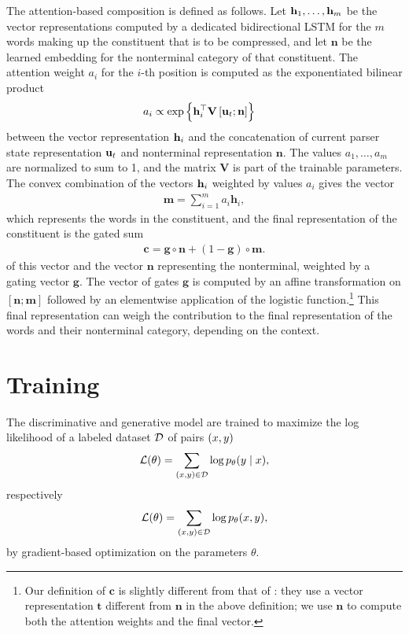     The attention-based composition is defined as follows. Let $\mathbf{h}_1, \dots, \mathbf{h}_m$ be the vector representations computed by a dedicated bidirectional LSTM for the $m$ words making up the constituent that is to be compressed, and let $\mathbf{n}$ be the learned embedding for the nonterminal category of that constituent. The attention weight $a_i$ for the $i$-th position is computed as the exponentiated bilinear product
    \begin{align*}
      a_i &\propto \exp \Big\{ \mathbf{h}_i^{\top} \mathbf{V} \, [\mathbf{u}_t ; \mathbf{n}] \Big\}
    \end{align*}
    between the vector representation $\mathbf{h}_i$ and the concatenation of current parser state representation $\mathbf{u}_t$ and nonterminal representation $\mathbf{n}$. The values $a_1, \dots, a_m$ are normalized to sum to 1, and the matrix $\mathbf{V}$ is part of the trainable parameters. The convex combination of the vectors $\mathbf{h}_i$ weighted by values $a_i$ gives the vector
    \begin{align*}
      \mathbf{m} = \sum_{i=1}^m a_i \mathbf{h}_i,
    \end{align*}
    which represents the words in the constituent, and the final representation of the constituent is the gated sum
    \begin{align*}
      \mathbf{c} = \mathbf{g} \circ \mathbf{n} + (1 - \mathbf{g}) \circ \mathbf{m}.
    \end{align*}
    of this vector and the vector $\mathbf{n}$ representing the nonterminal, weighted by a gating vector $\mathbf{g}$. The vector of gates $\mathbf{g}$ is computed by an affine transformation on $[ \mathbf{n}; \mathbf{m} ]$ followed by an elementwise application of the logistic function.\footnote{Our definition of $\mathbf{c}$ is slightly different from that of \citet{kuncoro2017syntax}: they use a vector representation $\mathbf{t}$ different from $\mathbf{n}$ in the above definition; we use $\mathbf{n}$ to compute both the attention weights and the final vector.} This final representation can weigh the contribution to the final representation of the words and their nonterminal category, depending on the context.

\section{Training}
  The discriminative and generative model are trained to maximize the log likelihood of a labeled dataset $\mathcal{D}$ of pairs $(x, y)$
  \begin{align*}
    \mathcal{L}(\theta) = \sum_{(x, y) \in \mathcal{D}} \log p_{\theta} (y \mid x),
  \end{align*}
  respectively
  \begin{align*}
    \mathcal{L}(\theta) = \sum_{(x, y) \in \mathcal{D}} \log p_{\theta} (x, y),
  \end{align*}
  by gradient-based optimization on the parameters $\theta$.

